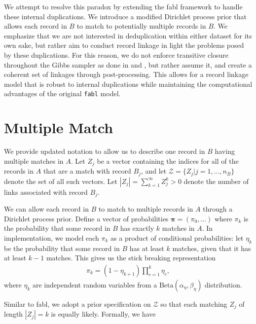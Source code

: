 \documentclass[12pt,letterpaper]{article}
\newcommand{\1}[1]{\mathbb{I}\!\left[#1\right]} %
\begin{document}
We attempt to resolve this paradox by extending the fabl framework to handle these internal duplications. We introduce a modified Dirichlet process prior that allows each record in $B$ to match to potentially multiple records in $B$. We emphasize that we are not interested in deduplication within either dataset for its own sake, but rather aim to conduct record linkage in light the problems posed by these duplications. For this reason, we do not enforce transitive closure throughout the Gibbs sampler as done in \cite{marchant_distributed_2019} and \cite{aleshinguendel2021multifile}, but rather assume it, and create a coherent set of linkages through post-processing. This allows for a record linkage model that is robust to internal duplications while maintaining the computational advantages of the original \texttt{fabl} model. 

\section{Multiple Match}

We provide updated notation to allow us to describe one record in $B$ having multiple matches in $A$. Let $Z_j$ be a vector containing the indices for all of the records in $A$ that are a match with record $B_j$, and let $\mathcal{Z} = \{Z_j | j = 1, \ldots, n_B\}$ denote the set of all such vectors. Let $|Z_j| = \sum_{k=1}^{\infty} Z_j^k > 0$ denote the number of links associated with record $B_j$. 

We can allow each record in $B$ to match to multiple records in $A$ through a Dirichlet process prior. Define a vector of probabilities $\bm{\pi} = (\pi_0, \ldots)$ where $\pi_k$ is the probability that some record in $B$ has exactly $k$ matches in $A$. In implementation, we model each $\pi_k$ as a product of conditional probabilities: let $\eta_k$ be the probability that some record in $B$ has at least $k$ matches, given that it has at least $k-1$ matches. This gives us the stick breaking representation
\begin{align}
	\pi_k = (1 - \eta_{k+1}) \prod_{c=1}^{k} \eta_c, 
\end{align}
where $\eta_k$ are independent random variables from a $\text{Beta}(\alpha_{\eta}, \beta_{\eta})$ distribution.

Similar to fabl, we adopt a prior specification on $\mathcal{Z}$ so that each matching $Z_j$ of length $|Z_j| = k$ is equally likely. Formally, we have
\end{document}
